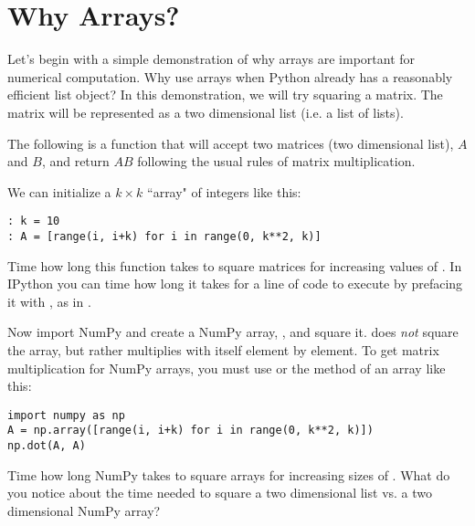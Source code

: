 \label{lab:Essentials_NumPy}

\section*{Why Arrays?}
Let's begin with a simple demonstration of why arrays are important for numerical computation.
Why use arrays when Python already has a reasonably efficient list object?
In this demonstration, we will try squaring a matrix.
The matrix will be represented as a two dimensional list (i.e. a list of lists).

The following is a function that will accept two matrices (two dimensional list), $A$ and $B$, and return $AB$ following the usual rules of matrix multiplication.

We can initialize a $k \times k$ ``array" of integers like this:
\begin{lstlisting}
: k = 10
: A = [range(i, i+k) for i in range(0, k**2, k)]
\end{lstlisting}

\begin{problem}
Time how long this function takes to square matrices for increasing values of .
In IPython you can time how long it takes for a line of code to execute by prefacing it with , as in .

Now import NumPy and create a NumPy array, , and square it.
 does \emph{not} square the array, but rather multiplies  with itself element by element.
To get matrix multiplication for NumPy arrays, you must use  or the  method of an array like this:
\begin{lstlisting}
import numpy as np
A = np.array([range(i, i+k) for i in range(0, k**2, k)])
np.dot(A, A)
\end{lstlisting}
Time how long NumPy takes to square arrays for increasing sizes of .
What do you notice about the time needed to square a two dimensional list vs. a two dimensional NumPy array?
\end{problem}

